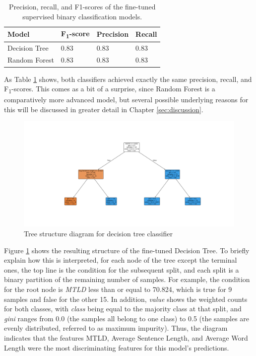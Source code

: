 \documentclass[12pt,a4paper]{article}
\numberwithin{figure}{section}
\numberwithin{table}{section}
\numberwithin{definition}{section}
\begin{document}
\begin{table}[!h]
  \centering
  \caption{Precision, recall, and F1-scores of the fine-tuned supervised binary classification models.}
  \renewcommand{\arraystretch}{1.0}
  \begin{tabular}{|l|l|l|l|}
  \hline
      \textbf{Model} & \textbf{F\textsubscript{1}-score} & \textbf{Precision} & \textbf{Recall} \\ \hline
      Decision Tree & 0.83 & 0.83 & 0.83 \\ 
      Random Forest & 0.83 & 0.83 & 0.83 \\ \hline
  \end{tabular}
  \label{tbl:supervisedevaluation}
\end{table}

As Table \ref{tbl:supervisedevaluation} shows, both classifiers achieved exactly the same precision, recall, and F\textsubscript{1}-scores. This comes as a bit of a surprise, since Random Forest is a comparatively more advanced model, but several possible underlying reasons for this will be discussed in greater detail in Chapter \ref{sec:discussion}.

\begin{figure}[!h]
  \centering
        \includegraphics[width=1.0\textwidth]{decisiontree.png}
        \caption{Tree structure diagram for decision tree classifier}
        \label{fig:decisiontree}
\end{figure}

Figure \ref{fig:decisiontree} shows the resulting structure of the fine-tuned Decision Tree. To briefly explain how this is interpreted, for each node of the tree except the terminal ones, the top line is the condition for the subsequent split, and each split is a binary partition of the remaining number of samples. For example, the condition for the root node is \textit{MTLD} less than or equal to 70.824, which is true for 9 samples and false for the other 15. In addition, \textit{value} shows the weighted counts for both classes, with \textit{class} being equal to the majority class at that split, and \textit{gini} ranges from 0.0 (the samples all belong to one class) to 0.5 (the samples are evenly distributed, referred to as maximum impurity). Thus, the diagram indicates that the features MTLD, Average Sentence Length, and Average Word Length were the most discriminating features for this model's predictions. 
\end{document}

